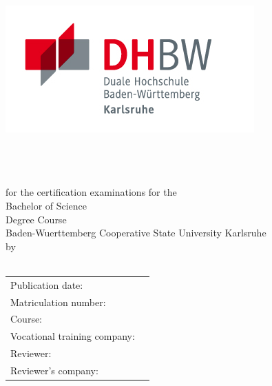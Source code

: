 \thispagestyle{plain}
\begin{titlepage}
\enlargethispage{4.0cm}
\sffamily 								%
				
\begin{flushright}
\includegraphics[scale=2.0]{Bilder/logo_dhbw.jpg}\\[5ex]
\end{flushright}

\begin{center}

\huge{\textsc{\textbf{\titel}}}\\[1.5ex]
\Large{\textbf{\untertitel}}\\[5ex]
\LARGE{\textbf{\arbeit}}\\[2ex]
\normalsize{for the certification examinations for the\\[1ex] Bachelor of Science}\\[3ex]
\Large{Degree Course \studiengang}\\[1ex]
\normalsize{Baden-Wuerttemberg Cooperative State University Karlsruhe}\\[5ex]
by\\[1ex] \autor \\[18ex]


\end{center}

\begin{flushleft}

\begin{tabular}{ll}
Publication date:				& \quad \abgabe \\
Matriculation number: 			& \quad \matrikelnr \\ 
Course: 						& \quad \kurs \\
Vocational training company:	& \quad \firma \\ 
Reviewer:  						& \quad \betreuerdhbw \\ 
Reviewer's company: 			& \quad \betreuerfirma \\ [5ex]


\end{tabular}
\end{flushleft}
\end{titlepage}
